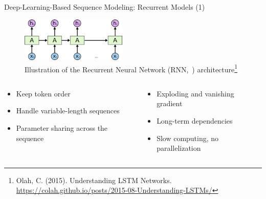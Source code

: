 \documentclass[11pt,aspectratio=169]{beamer}
\begin{document}
\begin{frame}{Deep-Learning-Based Sequence Modeling: Recurrent Models (1)}
    \begin{figure}
        \centering
        \includegraphics[width=0.45\textwidth]{RNN-unrolled.png}
        \caption{\centering Illustration of the Recurrent Neural Network (RNN,~\cite{rnn1, rnn2}) architecture\footnote{\tiny Olah, C. (2015). Understanding LSTM Networks. \url{https://colah.github.io/posts/2015-08-Understanding-LSTMs/}}}
    \end{figure}
    \begin{columns}
        \begin{column}{0.5\linewidth}
            \begin{itemize}
                \item {\color{darkgreen}\checkmark} Keep token order
                \item {\color{darkgreen}\checkmark} Handle variable-length sequences
                \item {\color{darkgreen}\checkmark} Parameter sharing across the sequence
            \end{itemize}
        \end{column}
        \begin{column}{0.5\linewidth}
            \begin{itemize}
                \item {\color{red}} Exploding and vanishing gradient
                \item {\color{red}} Long-term dependencies
                \item {\color{red}} Slow computing, no parallelization
            \end{itemize}
        \end{column}
    \end{columns}
\end{frame}
\end{document}
